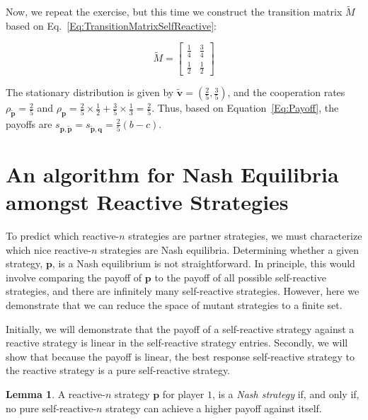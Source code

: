 \documentclass{article}
\theoremstyle{definition}
\newtheorem{lemma}[theorem]{Lemma}
\begin{document}
Now, we repeat the exercise, but this time we construct the transition matrix
$\tilde{M}$ based on Eq.~\eqref{Eq:TransitionMatrixSelfReactive}:

$$
\tilde{M} = 
\begin{bmatrix}
  \frac{1}{4} & \frac{3}{4}\\[6pt]
  \frac{1}{2} & \frac{1}{2}
\end{bmatrix}
$$

The stationary distribution is given by $\mathbf{\tilde{v}} = \left(\frac{2}{5},
\frac{3}{5}\right)$, and the cooperation rates $\rho_\mathbf{\tilde{p}} =
\frac{2}{5}$ and $\rho_\mathbf{p} = \frac{2}{5} \times \frac{1}{2} + \frac{3}{5}
\times \frac{1}{3} = \frac{2}{5}$. Thus, based on Equation~\eqref{Eq:Payoff},
the payoffs are $s_{\mathbf{p}, \mathbf{\tilde{p}}} = s_{\mathbf{\tilde{p}},
\mathbf{q}} = \frac{2}{5}(b - c)$.


\section{An algorithm for Nash Equilibria amongst Reactive Strategies}\label{section:algorithm_for_nash}

To predict which reactive-$n$ strategies are partner strategies, we must
characterize which nice reactive-$n$ strategies are Nash equilibria. Determining
whether a given strategy, $\mathbf{p}$, is a Nash equilibrium is not
straightforward. In principle, this would involve comparing the payoff of
$\mathbf{p}$ to the payoff of all possible self-reactive strategies, and there
are infinitely many self-reactive strategies. However, here we demonstrate that
we can reduce the space of mutant strategies to a finite set.

Initially, we will demonstrate that the payoff of a self-reactive strategy
against a reactive strategy is linear in the self-reactive strategy entries.
Secondly, we will show that because the payoff is linear, the best response
self-reactive strategy to the reactive strategy is a pure self-reactive
strategy.

\begin{lemma}\label{lemma:nash_against_pure_self_reactive} 
A reactive-$n$ strategy $\mathbf{p}$ for player $1$, is a \textit{Nash strategy}
if, and only if, no pure self-reactive-$n$ strategy can achieve a higher payoff
against itself.
\end{lemma}
\end{document}
